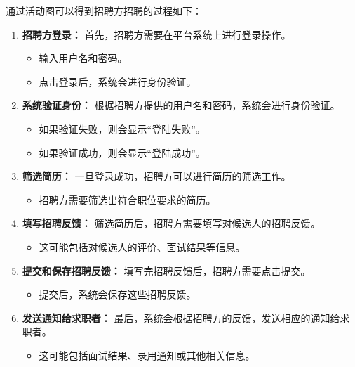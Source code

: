 \documentclass[UTF8,a4paper,10pt]{ctexart}
\begin{document}
通过活动图可以得到招聘方招聘的过程如下：

\begin{enumerate}
    \item \textbf{招聘方登录：} 首先，招聘方需要在平台系统上进行登录操作。
        \begin{itemize}
            \item 输入用户名和密码。
            \item 点击登录后，系统会进行身份验证。
        \end{itemize}
    
    \item \textbf{系统验证身份：} 根据招聘方提供的用户名和密码，系统会进行身份验证。
        \begin{itemize}
            \item 如果验证失败，则会显示“登陆失败”。
            \item 如果验证成功，则会显示“登陆成功”。
        \end{itemize}
    
    \item \textbf{筛选简历：} 一旦登录成功，招聘方可以进行简历的筛选工作。
        \begin{itemize}
            \item 招聘方需要筛选出符合职位要求的简历。
        \end{itemize}
    
    \item \textbf{填写招聘反馈：} 筛选简历后，招聘方需要填写对候选人的招聘反馈。
        \begin{itemize}
            \item 这可能包括对候选人的评价、面试结果等信息。
        \end{itemize}
    
    \item \textbf{提交和保存招聘反馈：} 填写完招聘反馈后，招聘方需要点击提交。
        \begin{itemize}
            \item 提交后，系统会保存这些招聘反馈。
        \end{itemize}
    
    \item \textbf{发送通知给求职者：} 最后，系统会根据招聘方的反馈，发送相应的通知给求职者。
        \begin{itemize}
            \item 这可能包括面试结果、录用通知或其他相关信息。
        \end{itemize}
\end{enumerate}
\end{document}
